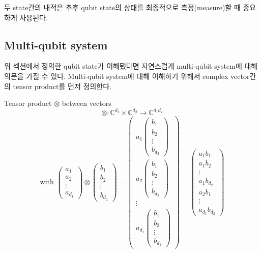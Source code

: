 \noindent 두 state간의 내적은 추후 qubit state의 상태를 최종적으로 측정(measure)할 때 중요하게 사용된다.

\subsection{Multi-qubit system}

위 섹션에서 정의한 qubit state가 이해됐다면 자연스럽게 multi-qubit system에 대해 의문을 가질 수 있다. Multi-qubit system에 대해 이해하기 위해서 complex vector간의 tensor product를 먼저 정의한다.

\begin{definition}
Tensor product \(\otimes\) between vectors
    \[
        \otimes : \mathbb{C}^{d_1} \times \mathbb{C}^{d_2} \rightarrow \mathbb{C}^{d_1  d_2}
    \]
    \[
    \text{with }
    \begin{pmatrix}
        a_1 \\ a_2 \\ \vdots \\ a_{d_1}
        \end{pmatrix}
        \otimes
        \begin{pmatrix}
        b_1 \\ b_2 \\ \vdots \\ b_{d_2}
        \end{pmatrix}
        =
        \begin{pmatrix}
        a_1\begin{pmatrix}
        b_1 \\ b_2 \\ \vdots \\ b_{d_2}
        \end{pmatrix}
         \\ a_2\begin{pmatrix}
        b_1 \\ b_2 \\ \vdots \\ b_{d_2}
        \end{pmatrix}
        \\
            \vdots
        \\ a_{d_1}\begin{pmatrix}
        b_1 \\ b_2 \\ \vdots \\ b_{d_2}
        \end{pmatrix}
        \end{pmatrix}
        =
        \begin{pmatrix}
        a_1b_1 \\ a_1b_2 \\ \vdots \\ a_1b_{d_2} \\ a_2b_1 \\ \vdots \\ a_{d_1}b_{d_2}
        \end{pmatrix}
    \]
\end{definition}

